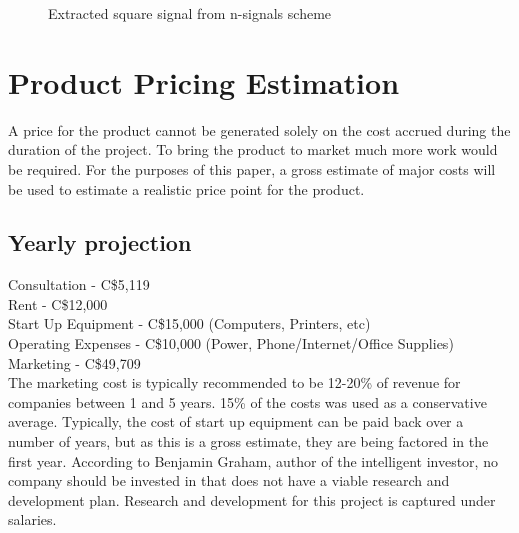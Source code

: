 \documentclass[letterpaper, 12 pt, conference]{report}
\numberwithin{figure}{section}
\begin{document}
\begin{figure}[h]
\noindent{}
\noindent{}
\caption{Extracted square signal from n-signals scheme}
\label{fig:lfmnsq}
\end{figure}

\FloatBarrier
\clearpage
\section{Product Pricing Estimation}
A price for the product cannot be generated solely on the cost accrued during the duration of the project.  To bring the product to market much more work would be required.  For the purposes of this paper, a gross estimate of major costs will be used to estimate a realistic price point for the product.\\

\subsection{Yearly projection}
Consultation - C\$5,119\\
Rent - C\$12,000\\
Start Up Equipment - C\$15,000 (Computers, Printers, etc)\\
Operating Expenses - C\$10,000 (Power, Phone/Internet/Office Supplies)\\
Marketing - C\$49,709 \\

The marketing cost is typically recommended to be 12-20\% of revenue for companies between 1 and 5 years.  15\% of the costs was used as a conservative average.  Typically, the cost of start up equipment can be paid back over a number of years, but as this is a gross estimate, they are being factored in the first year.  According to Benjamin Graham, author of the intelligent investor, no company should be invested in that does not have a viable research and development plan. \cite{graham_intelligent_2005}Research and development for this project is captured under salaries.\\
\end{document}
